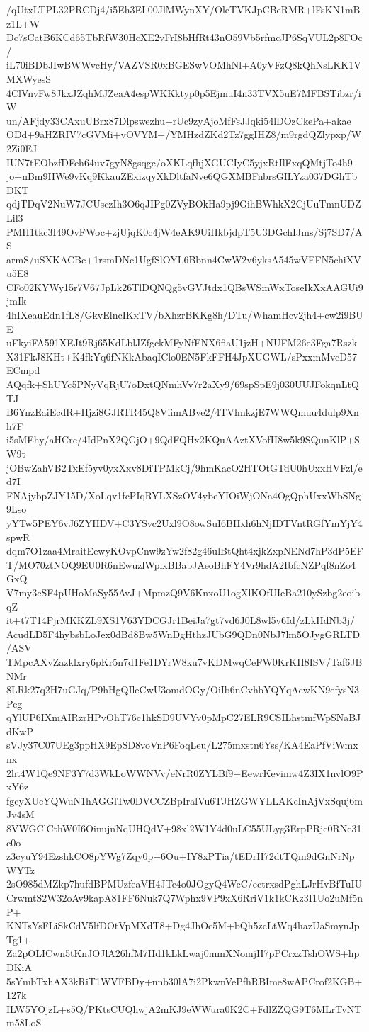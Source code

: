 /qUtxLTPL32PRCDj4/i5Eh3EL00JlMWynXY/OleTVKJpCBeRMR+lFsKN1mBz1L+W
Dc7sCatB6KCd65TbRfW30HcXE2vFrI8bHfRt43nO59Vb5rfmcJP6SqVUL2p8FOc/
iL70iBDbJIwBWWvcHy/VAZVSR0xBGESwVOMhNl+A0yVFzQ8kQhNsLKK1VMXWyesS
4ClVnvFw8JkxJZqhMJZeaA4espWKKktyp0p5EjmuI4n33TVX5uE7MFBSTibzr/iW
un/AFjdy33CAxuUBrx87Dlpswezhu+rUc9zyAjoMfFsJJqki54lDOzCkePa+akae
ODd+9aHZRIV7cGVMi+vOVYM+/YMHzdZKd2Tz7ggIHZ8/m9rgdQZlypxp/W2Zi0EJ
IUN7tEObzfDFeh64uv7gyN8gsqgc/oXKLqfhjXGUCIyC5yjxRtIlFxqQMtjTo4h9
jo+nBm9HWe9vKq9KkauZExizqyXkDltfaNve6QGXMBFnbrsGILYza037DGhTbDKT
qdjTDqV2NuW7JCUsczIh3O6qJIPg0ZVyBOkHa9pj9GihBWhkX2CjUuTmnUDZLil3
PMH1tkc3I49OvFWoc+zjUjqK0c4jW4eAK9UiHkbjdpT5U3DGchIJms/Sj7SD7/AS
armS/uSXKACBc+1rsmDNc1UgfSlOYL6Bbnn4CwW2v6yksA545wVEFN5chiXVu5E8
CFo02KYWy15r7V67JpLk26TlDQNQg5vGVJtdx1QBsWSmWxToseIkXxAAGUi9jmIk
4hIXeauEdn1fL8/GkvElncIKxTV/bXhzrBKKg8h/DTu/WhamHcv2jh4+cw2i9BUE
uFkyiFA591XEJt9Rj65KdLblJZfgckMFyNfFNX6fiaU1jzH+NUFM26e3Fga7Rszk
X31FkJ8KHt+K4fkYq6fNKkAbaqIClo0EN5FkFFH4JpXUGWL/sPxxmMvcD57ECmpd
AQqfk+ShUYc5PNyVqRjU7oDxtQNmhVv7r2aXy9/69spSpE9j030UUJFokqnLtQTJ
B6YnzEaiEcdR+Hjzi8GJRTR45Q8ViimABve2/4TVhnkzjE7WWQmuu4dulp9Xnh7F
i5sMEhy/aHCrc/4IdPnX2QGjO+9QdFQHx2KQuAAztXVofII8w5k9SQunKlP+SW9t
jOBwZahVB2TxEf5yv0yxXxv8DiTPMkCj/9hmKacO2HTOtGTdU0hUxxHVFzl/ed7I
FNAjybpZJY15D/XoLqv1fcPIqRYLXSzOV4ybeYIOiWjONa4OgQphUxxWbSNg9Lso
yYTw5PEY6vJ6ZYHDV+C3YSvc2Uxl9O8owSuI6BHxh6hNjIDTVntRGfYmYjY4spwR
dqm7O1zaa4MraitEewyKOvpCnw9zYw2f82g46ulBtQht4xjkZxpNENd7hP3dP5EF
T/MO70ztNOQ9EU0R6nEwuzlWplxBBabJAeoBhFY4Vr9hdA2IbfcNZPqf8nZo4GxQ
V7my3cSF4pUHoMaSy55AvJ+MpmzQ9V6KnxoU1ogXlKOfUIeBa210ySzbg2eoibqZ
it+t7T14PjrMKKZL9XS1V63YDCGJr1BeiJa7gt7vd6J0L8wl5v6Id/zLkHdNb3j/
AcudLD5F4hybsbLoJex0dBd8Bw5WnDgHthzJUbG9QDn0NbJ7lm5OJygGRLTD/ASV
TMpcAXvZazklxry6pKr5n7d1Fe1DYrW8ku7vKDMwqCeFW0KrKH8ISV/Taf6JBNMr
8LRk27q2H7uGJq/P9hHgQIleCwU3omdOGy/OiIb6nCvhbYQYqAcwKN9efysN3Peg
qYlUP6IXmAIRzrHPvOhT76c1hkSD9UVYv0pMpC27ELR9CSILhstmfWpSNaBJdKwP
sVJy37C07UEg3ppHX9EpSD8voVnP6FoqLeu/L275mxstn6Yss/KA4EaPfViWmxnx
2ht4W1Qe9NF3Y7d3WkLoWWNVv/eNrR0ZYLBf9+EewrKevimw4Z3IX1nvlO9PxY6z
fgcyXUcYQWuN1hAGGlTw0DVCCZBpIralVu6TJHZGWYLLAKcInAjVxSquj6mJv4sM
8VWGClCthW0I6OinujnNqUHQdV+98xl2W1Y4d0uLC55ULyg3ErpPRjc0RNc31c0o
z3cyuY94EzshkCO8pYWg7Zqy0p+6Ou+IY8xPTia/tEDrH72dtTQm9dGnNrNpWYTz
2sO985dMZkp7hufdBPMUzfeaVH4JTe4o0JOgyQ4WcC/ectrxsdPghLJrHvBfTuIU
CrwmtS2W32oAv9kapA81FF6Nuk7Q7Wphx9VP9xX6RriV1k1kCKz3I1Uo2uMf5nP+
KNTsYsFLiSkCdV5lfDOtVpMXdT8+Dg4JhOc5M+bQh5zcLtWq4hazUaSmynJpTg1+
Za2pOLICwn5tKnJOJlA26hfM7Hd1kLkLwaj0mmXNomjH7pPCrxzTshOWS+hpDKiA
5sYmbTxhAX3kRiT1WVFBDy+nnb30lA7i2PkwnVePfhRBIme8wAPCrof2KGB+127k
ILW5YOjzL+s5Q/PKtsCUQhwjA2mKJ9eWWura0K2C+FdlZZQG9T6MLrTvNTm58LoS
